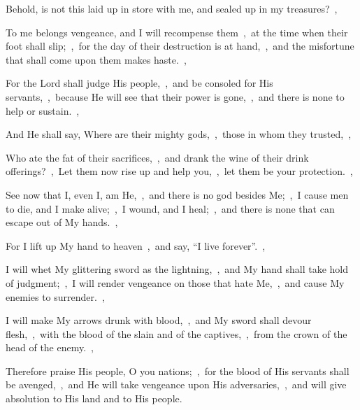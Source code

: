 \documentclass[12pt,twoside,a5paper]{article}
\begin{document}
\begin{normalparskip}
  Behold, is not this laid up in store with me, and sealed up in my treasures?~\sep

  To me belongs vengeance, and I will recompense them~\sep\ at the time when their foot shall slip;~\sep\ for the day of their destruction is at hand,~\sep\ and the misfortune that shall come upon them makes haste.~\sep

  For the Lord shall judge His people,~\sep\ and be consoled for His servants,~\sep\ because He will see that their power is gone,~\sep\ and there is none to help or sustain.~\sep

  And He shall say, Where are their mighty gods,~\sep\ those in whom they trusted,~\sep

  Who ate the fat of their sacrifices,~\sep\ and drank the wine of their drink offerings?~\sep\ Let them now rise up and help you,~\sep\ let them be your protection.~\sep

  See now that I, even I, am He,~\sep\ and there is no god besides Me;~\sep\ I cause men to die, and I make alive;~\sep\ I wound, and I heal;~\sep\ and there is none that can escape out of My hands.~\sep

  For I lift up My hand to heaven~\sep\ and say, ``I live forever''.~\sep

  I will whet My glittering sword as the lightning,~\sep\ and My hand shall take hold of judgment;~\sep\ I will render vengeance on those that hate Me,~\sep\ and cause My enemies to surrender.~\sep

  I will make My arrows drunk with blood,~\sep\ and My sword shall devour flesh,~\sep\ with the blood of the slain and of the captives,~\sep\ from the crown of the head of the enemy.~\sep

  Therefore praise His people, O you nations;~\sep\ for the blood of His servants shall be avenged,~\sep\ and He will take vengeance upon His adversaries,~\sep\ and will give absolution to His land and to His people.
\end{normalparskip}
\end{document}
